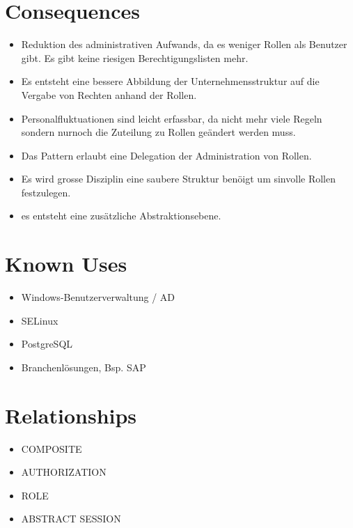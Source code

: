 \documentclass{article}
\begin{document}
\section{Consequences}

\begin{itemize}
  \item Reduktion des administrativen Aufwands, da es weniger Rollen als Benutzer gibt. Es gibt keine riesigen Berechtigungslisten mehr.
  \item Es entsteht eine bessere Abbildung der Unternehmensstruktur auf die Vergabe von Rechten anhand der Rollen.
  \item Personalfluktuationen sind leicht erfassbar, da nicht mehr viele Regeln sondern nurnoch die Zuteilung zu Rollen geändert werden muss.
  \item Das Pattern erlaubt eine Delegation der Administration von Rollen.
  \item Es wird grosse Disziplin eine saubere Struktur benöigt um sinvolle Rollen festzulegen.
  \item es entsteht eine zusätzliche Abstraktionsebene.
\end{itemize}

\section{Known Uses}
\begin{itemize}
\item Windows-Benutzerverwaltung / AD
\item SELinux
\item PostgreSQL
\item Branchenlösungen, Bsp. SAP
\end{itemize}

\section{Relationships}
\begin{itemize}
  \item COMPOSITE
  \item AUTHORIZATION
  \item ROLE
  \item ABSTRACT SESSION
\end{itemize}




\end{document}
